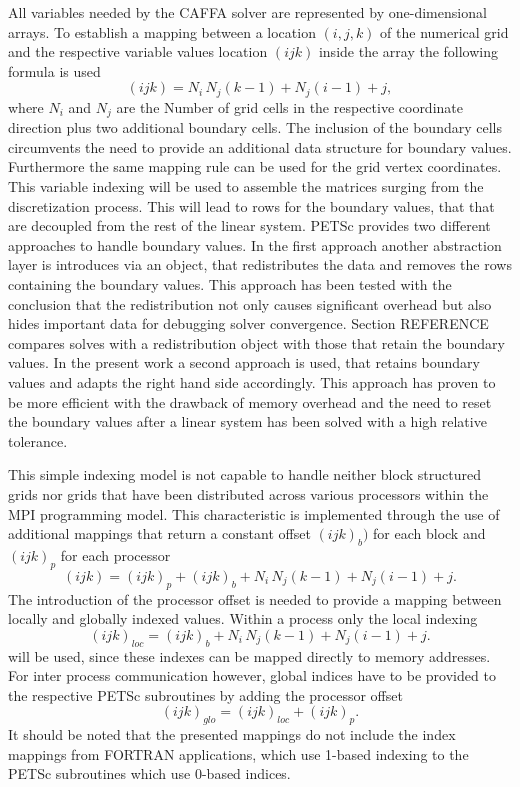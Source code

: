 All variables needed by the CAFFA solver are represented by one-dimensional arrays. To establish a mapping between a location \((i,j,k)\) of the numerical grid and the respective variable values location \((ijk)\) inside the array the following formula is used
\begin{displaymath}
  (ijk) = N_i \, N_j \left(k - 1\right) + N_j \left(i - 1\right) + j,
\end{displaymath}
where \(N_i\) and \(N_j\) are the Number of grid cells in the respective coordinate direction plus two additional boundary cells. The inclusion of the boundary cells circumvents the need to provide an additional data structure for boundary values. Furthermore the same mapping rule can be used for the grid vertex coordinates. This variable indexing will be used to assemble the matrices surging from the discretization process. This will lead to rows for the boundary values, that that are decoupled from the rest of the linear system. PETSc provides two different approaches to handle boundary values. In the first approach another abstraction layer is introduces via an object, that redistributes the data and removes the rows containing the boundary values. This approach has been tested with the conclusion that the redistribution not only causes significant overhead but also hides important data for debugging solver convergence. Section REFERENCE compares solves with a redistribution object with those that retain the boundary values. In the present work a second approach is used, that retains boundary values and adapts the right hand side accordingly. This approach has proven to be more efficient with the drawback of memory overhead and the need to reset the boundary values after a linear system has been solved with a high relative tolerance.

This simple indexing model is not capable to handle neither block structured grids nor grids that have been distributed across various processors within the MPI programming model. This characteristic is implemented through the use of additional mappings that return a constant offset \((ijk)_b)\) for each block and \((ijk)_p\) for each processor
\begin{displaymath}
  (ijk) = (ijk)_p + (ijk)_b +  N_i \, N_j \left(k - 1\right) + N_j \left(i - 1\right) + j.
\end{displaymath}
The introduction of the processor offset is needed to provide a mapping between locally and globally indexed values. Within a process only the local indexing 
\begin{displaymath}
  (ijk)_{loc} = (ijk)_b +  N_i \, N_j \left(k - 1\right) + N_j \left(i - 1\right) + j.
\end{displaymath}
will be used, since these indexes can be mapped directly to memory addresses. For inter process communication however, global indices have to be provided to the respective PETSc subroutines by adding the processor offset
\begin{equation}
  \label{eq:globalmap}
  (ijk)_{glo} = (ijk)_{loc} + (ijk)_p.
\end{equation}
It should be noted that the presented mappings do not include the index mappings from FORTRAN applications, which use 1-based indexing to the PETSc subroutines which use 0-based indices.

